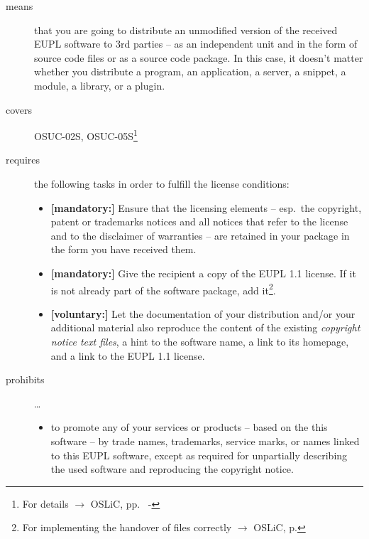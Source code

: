 \begin{description}

\item[means] that you are going to distribute an unmodified version of the
received EUPL software to 3rd parties -- as an independent unit and in the form
of source code files or as a source code package. In this case, it doesn't
matter whether you distribute a program, an application, a server, a snippet, a
module, a library, or a plugin.

\item[covers] OSUC-02S, OSUC-05S\footnote{For details $\rightarrow$
OSLiC, pp.\ \pageref{OSUC-02S-DEF} - \pageref{OSUC-05S-DEF}}

\item[requires] the following tasks in order to fulfill the license conditions:
\begin{itemize}
  
  \item \textbf{[mandatory:]} Ensure that the licensing elements -- esp.\ the
  copyright, patent or trademarks notices and all notices that refer to the
  license and to the disclaimer of warranties -- are retained in your package in
  the form you have received them.
  
  \item \textbf{[mandatory:]} Give the recipient a copy of the EUPL 1.1
  license. If it is not already part of the software package, add
  it\footnote{For implementing the handover of files correctly $\rightarrow$
  OSLiC, p. \pageref{DistributingFilesHint}}.
  
  \item \textbf{[voluntary:]} Let the documentation of your distribution and/or
  your additional material also reproduce the content of the existing
  \emph{copyright notice text files}, a hint to the software name, a link to its
  homepage, and a link to the EUPL 1.1 license.
\end{itemize}

\item[prohibits] \ldots
\begin{itemize}
  \item to promote any of your services or products -- based on the this software
  -- by trade names, trademarks, service marks, or names linked to this EUPL
  software, except as required for unpartially describing the used software and
  reproducing the copyright notice.
\end{itemize}

\end{description}


